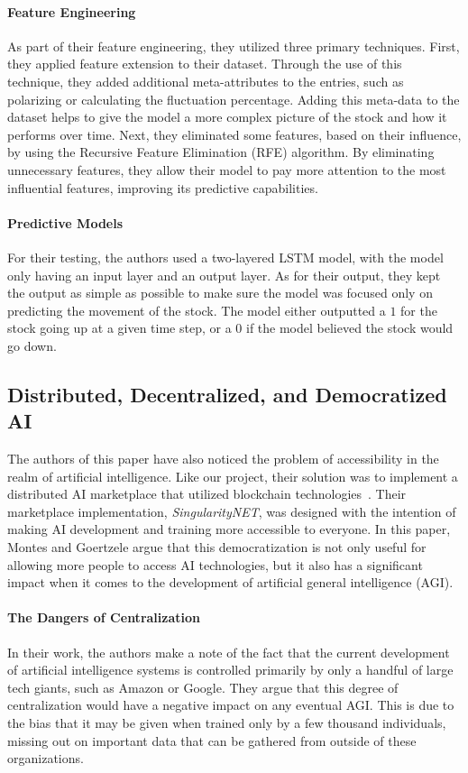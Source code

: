 \documentclass{ledger}
\begin{document}
\paragraph{Feature Engineering}
As part of their feature engineering, they utilized three primary techniques.  First, they applied feature extension to their dataset.  Through the use of this technique, they added additional meta-attributes to the entries, such as polarizing or calculating the fluctuation percentage.  Adding this meta-data to the dataset helps to give the model a more complex picture of the stock and how it performs over time.  Next, they eliminated some features, based on their influence, by using the Recursive Feature Elimination (RFE) algorithm.  By eliminating unnecessary features, they allow their model to pay more attention to the most influential features, improving its predictive capabilities.

\paragraph{Predictive Models}
For their testing, the authors used a two-layered LSTM model, with the model only having an input layer and an output layer.  As for their output, they kept the output as simple as possible to make sure the model was focused only on predicting the movement of the stock.  The model either outputted a $1$ for the stock going up at a given time step, or a $0$ if the model believed the stock would go down.


\subsection{Distributed, Decentralized, and Democratized AI}

The authors of this paper have also noticed the problem of accessibility in the realm of artificial intelligence.  Like our project, their solution was to implement a distributed AI marketplace that utilized blockchain technologies~\cite{democratizedAI}.  Their marketplace implementation, \textit{SingularityNET}, was designed with the intention of making AI development and training more accessible to everyone.  In this paper, Montes and Goertzele argue that this democratization is not only useful for allowing more people to access AI technologies, but it also has a significant impact when it comes to the development of artificial general intelligence (AGI).

\paragraph{The Dangers of Centralization}  In their work, the authors make a note of the fact that the current development of artificial intelligence systems is controlled primarily by only a handful of large tech giants, such as Amazon or  Google. They argue that this degree of centralization would have a negative impact on any eventual AGI.  This is due  to the bias that it may be given when trained only by a few thousand individuals, missing out on important data that can be gathered from outside of these organizations.
\end{document}
